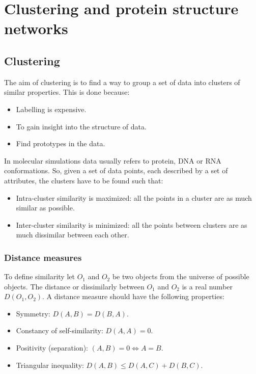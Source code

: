 \graphicspath{{chapters/16/images}}
\chapter{Clustering and protein structure networks}

\section{Clustering}
The aim of clustering is to find a way to group a set of data into clusters of similar properties.
This is done because:

\begin{multicols}{2}
	\begin{itemize}
		\item Labelling is expensive.
		\item To gain insight into the structure of data.
		\item Find prototypes in the data.
	\end{itemize}
\end{multicols}

In molecular simulations data usually refers to protein, DNA or RNA conformations.
So, given a set of data points, each described by a set of attributes, the clusters have to be found such that:

\begin{multicols}{2}
	\begin{itemize}
		\item Intra-cluster similarity is maximized: all the points in a cluster are as much similar as possible.
		\item Inter-cluster similarity is minimized: all the points between clusters are as much dissimilar between each other.
	\end{itemize}
\end{multicols}

	\subsection{Distance measures}
	To define similarity let $O_1$ and $O_2$ be two objects from the universe of possible objects.
	The distance or dissimilarly between $O_1$ and $O_2$ is a real number $D(O_1, O_2)$.
	A distance measure should have the following properties:

	\begin{itemize}
		\item Symmetry: $D(A,B) = D(B, A)$.
		\item Constancy of self-similarity: $D(A, A) = 0$.
		\item Positivity (separation): $(A, B) = 0\Leftrightarrow A=B$.
		\item Triangular inequality: $D(A, B) \le D(A, C) + D(B, C)$.
	\end{itemize}

